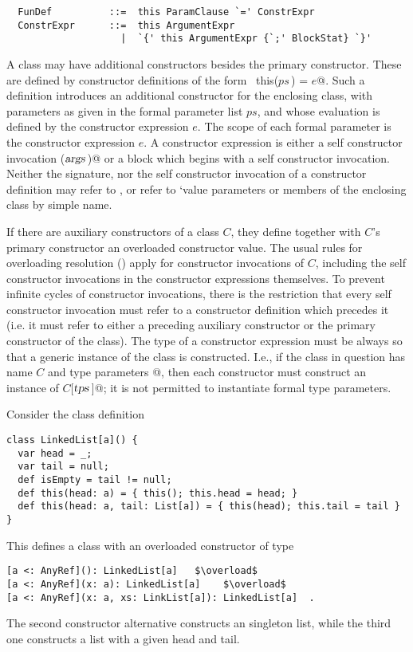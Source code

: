 \documentclass[a4paper,12pt,twoside,titlepage]{book}
\newcommand{\tps}{\mbox{\sl tps}}
\newcommand{\args}{\mbox{\sl args}}
\newcommand{\overload}{\la\mbox{\sf and}\ra}
\begin{document}
\syntax\begin{lstlisting}
  FunDef          ::=  this ParamClause `=' ConstrExpr
  ConstrExpr      ::=  this ArgumentExpr
                    |  `{' this ArgumentExpr {`;' BlockStat} `}'
\end{lstlisting}

A class may have additional constructors besides the primary
constructor.  These are defined by constructor definitions of the form
~\lstinline@def this($ps\,$) = $e$@.  Such a definition introduces an
additional constructor for the enclosing class, with parameters as
given in the formal parameter list $ps$, and whose evaluation is
defined by the constructor expression $e$.  The scope of each formal
parameter is the constructor expression $e$.  A constructor expression
is either a self constructor invocation \lstinline@this($\args\,$)@ or
a block which begins with a self constructor invocation.  Neither the
signature, nor the self constructor invocation of a constructor
definition may refer to \verb@this@, or refer to `value parameters or
members of the enclosing class by simple name.

If there are auxiliary constructors of a class $C$, they define
together with $C$'s primary constructor an overloaded constructor
value. The usual rules for overloading resolution
() apply for constructor invocations of $C$,
including the self constructor invocations in the constructor
expressions themselves. To prevent infinite cycles of constructor
invocations, there is the restriction that every self constructor
invocation must refer to a constructor definition which precedes it
(i.e. it must refer to either a preceding auxiliary constructor or the
primary constructor of the class).  The type of a constructor
expression must be always so that a generic instance of the class is
constructed.  I.e., if the class in question has name $C$ and type
parameters \lstinline@[$\tps\,$]@, then each constructor must construct an
instance of \lstinline@$C$[$\tps\,$]@; it is not permitted to instantiate formal
type parameters.

\example Consider the class definition

\begin{lstlisting}
class LinkedList[a]() {
  var head = _;
  var tail = null;
  def isEmpty = tail != null;  
  def this(head: a) = { this(); this.head = head; }
  def this(head: a, tail: List[a]) = { this(head); this.tail = tail }
}
\end{lstlisting}
This defines a class  with an overloaded constructor of type
\begin{lstlisting}
[a <: AnyRef](): LinkedList[a]   $\overload$
[a <: AnyRef](x: a): LinkedList[a]    $\overload$
[a <: AnyRef](x: a, xs: LinkList[a]): LinkedList[a]  .
\end{lstlisting}
The second constructor alternative constructs an singleton list, while the
third one constructs a list with a given head and tail.
\end{document}
